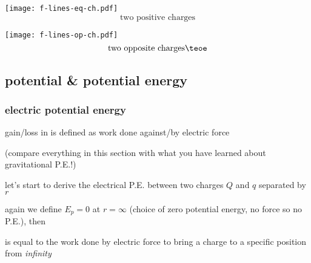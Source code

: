 
\begin{center}
	\noindent\begin{minipage}{0.48\textwidth}
		\begin{center}
			\texttt{[image: f-lines-eq-ch.pdf]}
			\begin{equation*}
			\text{two positive charges}
			\end{equation*}
		\end{center}
	\end{minipage}\hfill
	\begin{minipage}{0.48\textwidth}
		\begin{center}
			\texttt{[image: f-lines-op-ch.pdf]}
			\begin{equation*}
			\text{two opposite charges} \teoe
			\end{equation*}
		\end{center}	
	\end{minipage}
\end{center}




\subsection{potential \& potential energy }

\subsubsection{electric potential energy}
\label{sec:electric-potential}

gain/loss in  is defined as work done against/by electric force

(compare everything in this section with what you have learned about gravitational P.E.!)

let's start to derive the electrical P.E. between two charges $Q$ and $q$ separated by $r$

again we define $E_p=0$ at $r=\infty$ (choice of zero potential energy, no force so no P.E.), then

\begin{ilight}
	 is equal to the work done by electric force to bring a charge to a specific position from \emph{infinity}
\end{ilight} 

